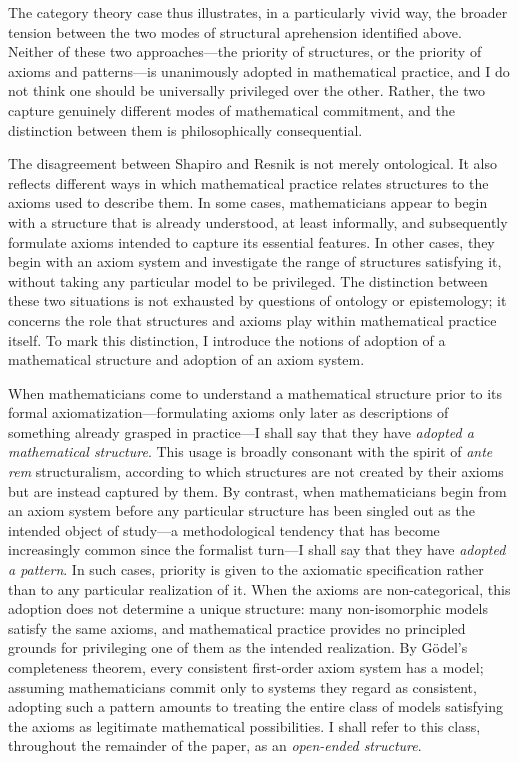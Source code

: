 \documentclass[11pt,a4paper]{book}
\theoremstyle{plain}
\begin{document}
The category theory case thus illustrates, in a particularly vivid way, the broader tension between the two modes of structural aprehension identified above. Neither of these two approaches---the priority of structures, or the priority of axioms and patterns---is unanimously adopted in mathematical practice, and I do not think one should be universally privileged over the other. Rather, the two capture genuinely different modes of mathematical commitment, and the distinction between them is philosophically consequential. 

The disagreement between Shapiro and Resnik is not merely ontological. It also reflects different ways in which mathematical practice relates structures to the axioms used to describe them. In some cases, mathematicians appear to begin with a structure that is already understood, at least informally, and subsequently formulate axioms intended to capture its essential features. In other cases, they begin with an axiom system and investigate the range of structures satisfying it, without taking any particular model to be privileged. The distinction between these two situations is not exhausted by questions of ontology or epistemology; it concerns the role that structures and axioms play within mathematical practice itself. To mark this distinction, I introduce the notions of adoption of a mathematical structure and adoption of an axiom system.

When mathematicians come to understand a mathematical structure prior to its formal axiomatization—formulating axioms only later as descriptions of something already grasped in practice—I shall say that they have \textit{adopted a mathematical structure}. This usage is broadly consonant with the spirit of \textit{ante rem} structuralism, according to which structures are not created by their axioms but are instead captured by them. By contrast, when mathematicians begin from an axiom system before any particular structure has been singled out as the intended object of study—a methodological tendency that has become increasingly common since the formalist turn—I shall say that they have \textit{adopted a pattern}. In such cases, priority is given to the axiomatic specification rather than to any particular realization of it. When the axioms are non-categorical, this adoption does not determine a unique structure: many non-isomorphic models satisfy the same axioms, and mathematical practice provides no principled grounds for privileging one of them as the intended realization. By Gödel's completeness theorem, every consistent first-order axiom system has a model; assuming mathematicians commit only to systems they regard as consistent, adopting such a pattern amounts to treating the entire class of models satisfying the axioms as legitimate mathematical possibilities. I shall refer to this class, throughout the remainder of the paper, as an \textit{open-ended structure}.
\end{document}
